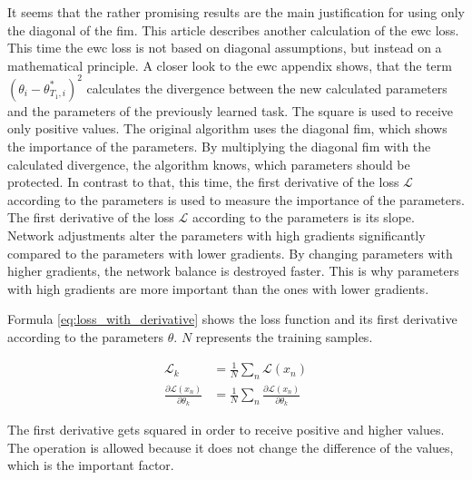 It seems that the rather promising results are the main justification for using only the diagonal of the \acrshort{fim}.
\newline
This article describes another calculation of the \acrshort{ewc} loss.
This time the \acrshort{ewc} loss is not based on diagonal assumptions, but instead on a mathematical principle.
\newline
A closer look to the \acrshort{ewc} appendix shows, that the term $(\theta_i - \theta^*_{T_1,i})^2$ calculates the divergence between the new calculated parameters and the parameters of the previously learned task.
The square is used to receive only positive values.
\newline
The original algorithm uses the diagonal \acrshort{fim}, which shows the importance of the parameters.
By multiplying the diagonal \acrshort{fim} with the calculated divergence, the algorithm knows, which parameters should be protected.
\newline
In contrast to that, this time, the first derivative of the loss $\mathcal{L}$ according to the parameters is used to measure the importance of the parameters.
The first derivative of the loss $\mathcal{L}$ according to the parameters is its slope.
Network adjustments alter the parameters with high gradients significantly compared to the parameters with lower gradients.
By changing parameters with higher gradients, the network balance is destroyed faster.
This is why parameters with high gradients are more important than the ones with lower gradients.

Formula \ref{eq:loss_with_derivative} shows the loss function and its first derivative according to the parameters $\theta$. $N$ represents the training samples.

\begin{equation}
    \begin{split}
        \mathcal{L}_k & = 
        \frac{1}{N}
        \sum_{n} 
            \mathcal{L}(x_n)
        \\
        \frac{\partial \mathcal{L}(x_n)}{\partial \theta_k} & = 
        \frac{1}{N}
        \sum_{n} 
            \frac{\partial \mathcal{L}(x_n)}{\partial \theta_k}
    \end{split}
    \label{eq:loss_with_derivative}
\end{equation}

The first derivative gets squared in order to receive positive and higher values.
The operation is allowed because it does not change the difference of the values, which is the important factor.

